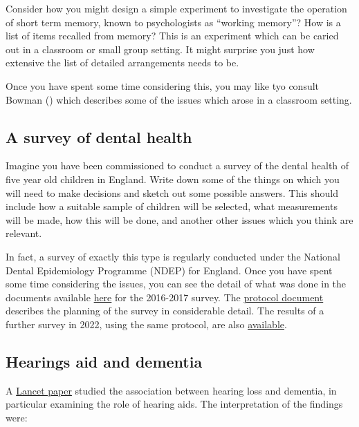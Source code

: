\documentclass[
]{book}
\begin{document}
Consider how you might design a simple experiment to investigate the operation of short term memory, known to psychologists as ``working memory''? How is a list of items recalled from memory? This is an experiment which can be caried out in a classroom or small group setting. It might surprise you just how extensive the list of detailed arrangements needs to be.

Once you have spent some time considering this, you may like tyo consult Bowman () which describes some of the issues which arose in a classroom setting.

\subsection{A survey of dental health}\label{a-survey-of-dental-health}

Imagine you have been commissioned to conduct a survey of the dental health of five year old children in England. Write down some of the things on which you will need to make decisions and sketch out some possible answers. This should include how a suitable sample of children will be selected, what measurements will be made, how this will be done, and another other issues which you think are relevant.

In fact, a survey of exactly this type is regularly conducted under the National Dental Epidemiology Programme (NDEP) for England. Once you have spent some time considering the issues, you can see the detail of what was done in the documents available \href{https://www.gov.uk/government/statistics/oral-health-survey-of-5-year-old-children-2017\#:~:text=The\%20results\%20of\%20the\%20oral,experience\%20of\%20obvious\%20dental\%20decay}{here} for the 2016-2017 survey. The \href{https://assets.publishing.service.gov.uk/government/uploads/system/uploads/attachment_data/file/774469/Oral_health_survey_protocol_5_year_olds_2016.pdf}{protocol document} describes the planning of the survey in considerable detail. The results of a further survey in 2022, using the same protocol, are also \href{https://www.gov.uk/government/statistics/oral-health-survey-of-5-year-old-children-2022}{available}.

\subsection{Hearings aid and dementia}\label{hearings-aid-and-dementia}

A \href{https://www.thelancet.com/journals/lanpub/article/PIIS2468-2667(23)00048-8/fulltext}{Lancet paper} studied the association between hearing loss and dementia, in particular examining the role of hearing aids. The interpretation of the findings were:
\end{document}
